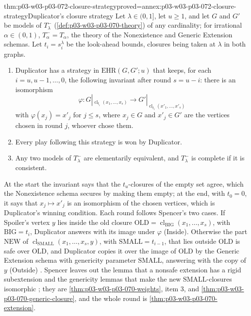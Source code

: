 \begin{hbtheorem}{thm:p03-w03-p03-072-closure-strategy}{proved=annex:p03-w03-p03-072-closure-strategy}{Duplicator's closure strategy}
Let \(\lambda\in(0,1]\), let \(u\geq1\), and let \(G\) and \(G'\) be models
of \(T^-_\lambda\) (\cref{def:p03-w03-p03-070-theory}) of any cardinality;
for irrational \(\alpha\in(0,1)\), \(T^-_\alpha=T_\alpha\), the theory of
the Nonexistence and Generic Extension schemas.  Let
\(t_i=s^\lambda_i\) be the look-ahead bounds, closures being taken at
\(\lambda\) in both graphs.
\begin{enumerate}
\item Duplicator has a strategy in \(\mathrm{EHR}(G,G';u)\) that keeps, for
  each \(i=u,u-1,\ldots,0\), the following invariant after round
  \(s=u-i\): there is an isomorphism
  \[
    \varphi\colon G|_{\operatorname{cl}_{t_i}(x_1,\ldots,x_s)}\to
    G'|_{\operatorname{cl}_{t_i}(x'_1,\ldots,x'_s)}
  \]
  with \(\varphi(x_j)=x'_j\) for \(j\leq s\), where \(x_j\in G\) and
  \(x'_j\in G'\) are the vertices chosen in round \(j\), whoever chose them.
\item Every play following this strategy is won by Duplicator.
\item Any two models of \(T^-_\lambda\) are elementarily equivalent, and
  \(T^-_\lambda\) is complete if it is consistent.
\end{enumerate}
\end{hbtheorem}

At the start the invariant says that the \(t_u\)-closures of the empty set
agree, which the Nonexistence schema secures by making them empty; at the
end, with \(t_0=0\), it says that \(x_j\mapsto x'_j\) is an isomorphism of
the chosen vertices, which is Duplicator's winning condition.  Each round
follows Spencer's two cases.  If Spoiler's vertex \(y\) lies inside the old
closure \(\mathrm{OLD}=\operatorname{cl}_{\mathrm{BIG}}(x_1,\ldots,x_s)\),
with \(\mathrm{BIG}=t_i\), Duplicator answers with its image under
\(\varphi\) (Inside).  Otherwise the part \(\mathrm{NEW}\) of
\(\operatorname{cl}_{\mathrm{SMALL}}(x_1,\ldots,x_s,y)\), with
\(\mathrm{SMALL}=t_{i-1}\), that lies outside \(\mathrm{OLD}\) is safe over
\(\mathrm{OLD}\), and Duplicator copies it over the image of \(\mathrm{OLD}\)
by the Generic Extension schema with genericity parameter \(\mathrm{SMALL}\),
answering with the copy of \(y\) (Outside)
\cite[p.~12]{Spencer2007LogicRandomStructuresAuthor}.  Spencer leaves out
the lemma that a nonsafe extension has a rigid subextension and the
genericity lemmas that make the new \(\mathrm{SMALL}\)-closures isomorphic
\cite[p.~12]{Spencer2007LogicRandomStructuresAuthor}; they are
\cref{thm:p03-w03-p03-070-weights}, item 3, and
\cref{thm:p03-w03-p03-070-generic-closure}, and the whole round is
\cref{thm:p03-w03-p03-070-extension}.

